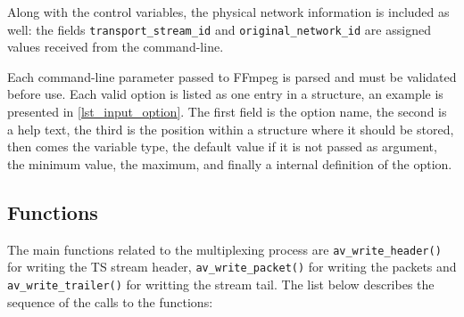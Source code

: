 \documentclass[
	12pt,				%
	openright,			%
	twoside,			%
	a4paper,			%
	brazil,
	french,				%
	english
	]{abntex2}
\begin{document}
Along with the control variables, the physical network information is included as well: the fields \texttt{transport\_stream\_id} and \texttt{original\_network\_id} are assigned values received from the command-line.

Each command-line parameter passed to FFmpeg is parsed and must be validated before use. Each valid option is listed as one entry in a structure, an example is presented in \autoref{lst_input_option}. The first field is the option name, the second is a help text, the third is the position within a structure where it should be stored, then comes the variable type, the default value if it is not passed as argument, the minimum value, the maximum, and finally a internal definition of the option.



\subsection{Functions}

The main functions related to the multiplexing process are \texttt{av\_write\_header()} for writing the TS stream header, \texttt{av\_write\_packet()} for writing the packets and \texttt{av\_write\_trailer()} for writting the stream tail. The list below describes the sequence of the calls to the functions:
\end{document}
